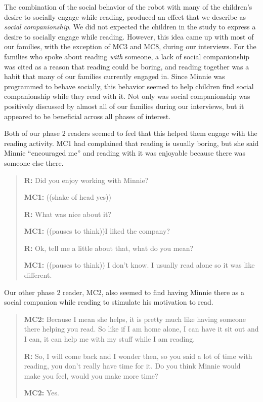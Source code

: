 \documentclass{sigchi}
\begin{document}
The combination of the social behavior of the robot with many of the children's desire to socially engage while reading, produced an effect that we describe as \textit{social companionship}. We did not expected the children in the study to express a desire to socially engage while reading.  However, this idea came up with most of our families, with the exception of MC3 and MC8, during our interviews.  For the families who spoke about reading \textit{with} someone, a lack of social companionship was cited as a reason that reading could be boring, and reading together was a habit that many of our families currently engaged in.  Since Minnie was programmed to behave socially, this behavior seemed to help children find social companionship while they read with it. Not only was social companionship was positively discussed by almost all of our families during our interviews, but it appeared to be beneficial across all phases of interest. 

Both of our phase 2 readers seemed to feel that this helped them engage with the reading activity.  MC1 had complained that reading is usually boring, but she said Minnie ``encouraged me'' and reading with it was enjoyable because there was someone else there.
	
	\begin{quote}
		\textbf{R:} Did you enjoy working with Minnie?
		
		\textbf{MC1:} ((shake of head yes))
		
		\textbf{R:} What was nice about it?
		
		\textbf{MC1:} ((pauses to think))I liked the company?
		
		\textbf{R:} Ok, tell me a little about that, what do you mean?
		
		\textbf{MC1:} ((pauses to think)) I don't know. I usually read alone so it was like different.
	\end{quote}

 Our other phase 2 reader, MC2, also seemed to find having Minnie there as a social companion while reading to stimulate his motivation to read.  
  
	 \begin{quote}
	   \textbf{MC2:} Because I mean she helps, it is pretty much like having someone there helping you read. So like if I am home alone, I can have it sit out and I can, it can help me with my stuff while I am reading. 
	   
	   \textbf{R:} So, I will come back and I wonder then, so you said a lot of time with reading, you don't really have time for it. Do you think Minnie would make you feel, would you make more time? 
	   
	   \textbf{MC2:} Yes. 
 	\end{quote}
 
\end{document}
